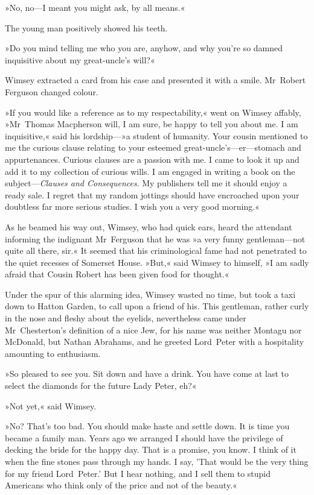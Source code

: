 »No, no—I meant you might ask, by all means.«

The young man positively showed his teeth.

»Do you mind telling me who you are, anyhow, and why you're so damned inquisitive about my great-uncle's will?«

Wimsey extracted a card from his case and presented it with a smile. Mr~Robert Ferguson changed colour.

»If you would like a reference as to my respectability,« went on Wimsey affably, »Mr~Thomas Macpherson will, I am sure, be happy to tell you about me. I am inquisitive,« said his lordship—»a student of humanity. Your cousin mentioned to me the curious clause relating to your esteemed great-uncle's—er—stomach and appurtenances. Curious clauses are a passion with me. I came to look it up and add it to my collection of curious wills. I am engaged in writing a book on the subject—\textit{Clauses and Consequences}. My publishers tell me it should enjoy a ready sale. I regret that my random jottings should have encroached upon your doubtless far more serious studies. I wish you a very good morning.«

As he beamed his way out, Wimsey, who had quick ears, heard the attendant informing the indignant Mr~Ferguson that he was »a very funny gentleman—not quite all there, sir.« It seemed that his criminological fame had not penetrated to the quiet recesses of Somerset House. »But,« said Wimsey to himself, »I am sadly afraid that Cousin Robert has been given food for thought.«

Under the spur of this alarming idea, Wimsey wasted no time, but took a taxi down to Hatton Garden, to call upon a friend of his. This gentleman, rather curly in the nose and fleshy about the eyelids, nevertheless came under Mr~Chesterton's definition of a nice Jew, for his name was neither Montagu nor McDonald, but Nathan Abrahams, and he greeted Lord~Peter with a hospitality amounting to enthusiasm.

»So pleased to see you. Sit down and have a drink. You have come at last to select the diamonds for the future Lady Peter, eh?«

»Not yet,« said Wimsey.

»No? That's too bad. You should make haste and settle down. It is time you became a family man. Years ago we arranged I should have the privilege of decking the bride for the happy day. That is a promise, you know. I think of it when the fine stones pass through my hands. I say, 'That would be the very thing for my friend Lord~Peter.' But I hear nothing, and I sell them to stupid Americans who think only of the price and not of the beauty.«

